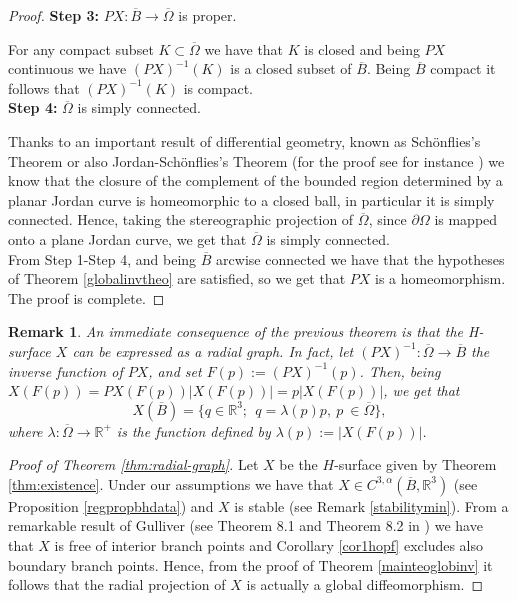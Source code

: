 \documentclass[a4paper,reqno,10pt,oneside]{amsart}
\numberwithin{equation}{section}
\newtheorem{remark}[theorem]{Remark}
\begin{document}
\begin{proof}
\textbf{Step 3:} $PX\colon\overline B \to \overline \Omega$ is proper.

For any compact subset  $K \subset \overline \Omega$ we have that $K$ is closed and being $PX$ continuous we have $(PX)^{-1} (K)$ is a closed subset of $\overline{B}$. Being $\overline B$ compact it follows that $(PX)^{-1} (K)$ is compact.\\

\textbf{Step 4:}  $\overline\Omega$ is simply connected.

Thanks to an important result of differential geometry, known as Sch\"onflies's Theorem or also Jordan-Sch\"onflies's Theorem (for the proof see for instance \cite{Thomassen}) we know that the closure of the complement of the bounded region determined by a planar Jordan curve is homeomorphic to a closed ball, in particular it is simply connected. Hence, taking the stereographic projection of $\overline\Omega$, since $\partial \Omega$ is mapped onto a plane Jordan curve, we get that $\overline\Omega$ is simply connected.\\

From Step 1-Step 4, and being $\overline B$ arcwise connected we have that the hypotheses of Theorem \ref{globalinvtheo} are satisfied, so we get that $PX$ is a homeomorphism. The proof is complete.
\end{proof}

\begin{remark}
An immediate consequence of the previous theorem is that the H-surface $X$ can be expressed as a radial graph. In fact, let $(PX)^{-1}: \overline \Omega \to \overline B$ the inverse function of $PX$, and set $F(p):=(PX)^{-1}(p)$. Then, being $X(F(p))=PX(F(p)) |X(F(p))|= p |X(F(p))|$, we get that $$X(\overline B)=\{q \in {\mathbb R}^3;\ \ q= \lambda(p) p,\ p\ \in \overline\Omega\},$$ where $\lambda\colon\overline\Omega \to {\mathbb R}^+$  is the function defined by $\lambda(p):=|X(F(p))|$.\\
\end{remark}

\begin{proof}[Proof of Theorem \ref{thm:radial-graph}]
Let $X$ be the $H$-surface given by Theorem \ref{thm:existence}.  Under our assumptions we have that $X \in C^{3,\alpha}(\overline B, {\mathbb R}^3)$ (see Proposition \ref{regpropbhdata}) and $X$ is stable (see Remark \ref{stabilitymin}).
From a remarkable result of Gulliver (see Theorem 8.1 and Theorem 8.2 in \cite{Gulliver}) we have that $X$  is free of interior branch points and Corollary \ref{cor1hopf} excludes also boundary branch points. Hence, from the proof of Theorem \ref{mainteoglobinv} it follows that the radial projection of $X$ is actually a global diffeomorphism.
\end{proof}
\end{document}
